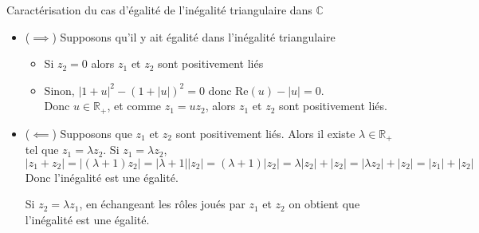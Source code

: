 \documentclass{article}
\renewenvironment{question_kholle}[2][ ]
{
	\subsection{\texorpdfstring{#2}{}}
	\notblank{#1}
	{
		\noindent #1
		\bigbreak
	}
	{}
	\begin{proof}
}
{
	\end{proof}
}
\begin{document}
\begin{question_kholle}{Caractérisation du cas d'égalité de l'inégalité triangulaire dans $\mathbb C$}
	\;\\
	\begin{itemize}[label=$\star$]
		\item ($\implies$) Supposons qu'il y ait égalité dans l'inégalité triangulaire
		      \begin{itemize}[label=$\lozenge$]
			      \item Si $z_{2} = 0$ alors $z_{1}$ et $z_{2}$ sont positivement liés
			      \item Sinon, $\lvert 1+u \rvert ^{2} - (1+\lvert u \rvert )^{2}  = 0$ donc $\mathrm{Re}(u) - \lvert u \rvert = 0$.\\
			            Donc $u \in \mathbb{R}_{+}$, et comme $z_{1} = uz_{2}$, alors $z_{1}$ et $z_{2}$ sont positivement liés.
		      \end{itemize}
		\item ($\impliedby$) Supposons que $z_{1}$ et $z_{2}$ sont positivement liés. Alors il existe $\lambda \in \mathbb{R}_{+}$ tel que $z_{1} = \lambda z_{2}$.
		      Si $z_{1} = \lambda z_{2}$,
		      $$
			      \lvert z_{1}+z_{2} \rvert  = \lvert (\lambda+1) z_{2} \rvert  = \lvert \lambda + 1  \rvert \lvert z_{2} \rvert = (\lambda+1)\lvert z_{2} \rvert = \lambda \lvert z_{2} \rvert +\lvert z_{2} \rvert  = \lvert \lambda z_{2} \rvert +\lvert z_{2} \rvert = \lvert z_{1} \rvert + \lvert z_{2} \rvert
		      $$
		      Donc l'inégalité est une égalité.

		      Si $z_{2} = \lambda z_{1}$, en échangeant les rôles joués par $z_{1}$ et $z_{2}$ on obtient que l'inégalité est une égalité.
	\end{itemize}
\end{question_kholle}
\end{document}
